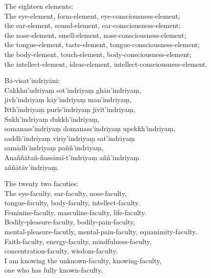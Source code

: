 \begin{english}
  The eighteen elements:\\
  The eye-element, form-element, eye-consciousness-element;\\
  the ear-element, sound-element, ear-consciousness-element;\\
  the nose-element, smell-element, nose-consciousness-element;\\
  the tongue-element, taste-element, tongue-consciousness-element;\\
  the body-element, touch-element, body-consciousness-element;\\
  the intellect-element, ideas-element, intellect-consciousness-element.
\end{english}

Bā-vīsat'indriyāni:\\
Cakkhu'ndriyaṃ sot'indriyaṃ ghān'indriyaṃ,\\
jivh'indriyaṃ kāy'indriyaṃ man'indriyaṃ,\\
Itth'indriyaṃ puris'indriyaṃ jīvit'indriyaṃ,\\
Sukh'indriyaṃ dukkh'indriyaṃ,\\
somanass'indriyaṃ domanass'indriyaṃ upekkh'indriyaṃ,\\
saddh'indriyaṃ viriy'indriyaṃ sat'indriyaṃ\\
samādh'indriyaṃ paññ'indriyaṃ,\\
Anaññātañ-ñassāmī-t'indriyaṃ aññ'indriyaṃ\\
aññātāv'indriyaṃ.

\begin{english}
  The twenty two facuties:\\
  The eye-faculty, ear-faculty, nose-faculty,\\
  tongue-faculty, body-faculty, intellect-faculty.\\
  Feminine-faculty, masculine-faculty, life-faculty.\\
  Bodily-pleasure-faculty, bodily-pain-faculty,\\
  mental-pleasure-facutly, mental-pain-faculty, equanimity-faculty.\\
  Faith-faculty, energy-faculty, mindfulness-faculty,\\
  concentration-faculty, wisdom-faculty.\\
  I am knowing the unknown-faculty, knowing-faculty,\\
  one who has fully known-faculty.
\end{english}

